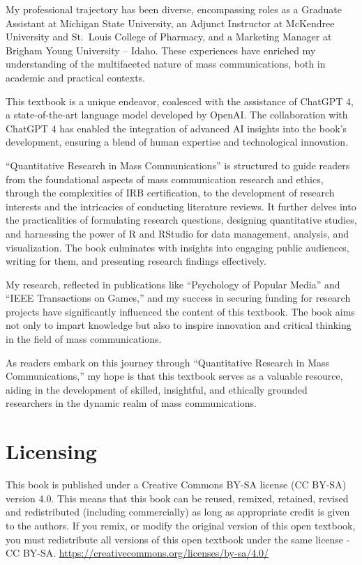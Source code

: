\documentclass[
]{book}
\begin{document}
My professional trajectory has been diverse, encompassing roles as a Graduate Assistant at Michigan State University, an Adjunct Instructor at McKendree University and St.~Louis College of Pharmacy, and a Marketing Manager at Brigham Young University -- Idaho. These experiences have enriched my understanding of the multifaceted nature of mass communications, both in academic and practical contexts.

This textbook is a unique endeavor, coalesced with the assistance of ChatGPT 4, a state-of-the-art language model developed by OpenAI. The collaboration with ChatGPT 4 has enabled the integration of advanced AI insights into the book's development, ensuring a blend of human expertise and technological innovation.

``Quantitative Research in Mass Communications'' is structured to guide readers from the foundational aspects of mass communication research and ethics, through the complexities of IRB certification, to the development of research interests and the intricacies of conducting literature reviews. It further delves into the practicalities of formulating research questions, designing quantitative studies, and harnessing the power of R and RStudio for data management, analysis, and visualization. The book culminates with insights into engaging public audiences, writing for them, and presenting research findings effectively.

My research, reflected in publications like ``Psychology of Popular Media'' and ``IEEE Transactions on Games,'' and my success in securing funding for research projects have significantly influenced the content of this textbook. The book aims not only to impart knowledge but also to inspire innovation and critical thinking in the field of mass communications.

As readers embark on this journey through ``Quantitative Research in Mass Communications,'' my hope is that this textbook serves as a valuable resource, aiding in the development of skilled, insightful, and ethically grounded researchers in the dynamic realm of mass communications.

\hypertarget{licensing}{%
\section{Licensing}\label{licensing}}

This book is published under a Creative Commons BY-SA license (CC BY-SA) version 4.0. This means that this book can be reused, remixed, retained, revised and redistributed (including commercially) as long as appropriate credit is given to the authors. If you remix, or modify the original version of this open textbook, you must redistribute all versions of this open textbook under the same license - CC BY-SA. \url{https://creativecommons.org/licenses/by-sa/4.0/}
\end{document}
